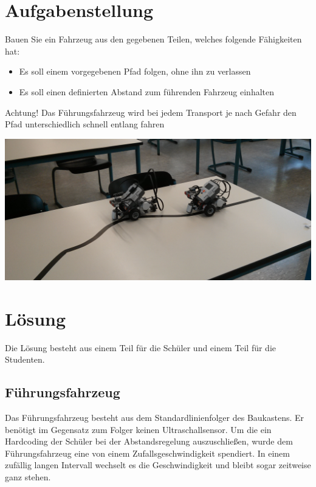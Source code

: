   \section{Aufgabenstellung}
    Bauen Sie ein Fahrzeug aus den gegebenen Teilen, welches folgende Fähigkeiten hat:

    \begin{itemize}
      \item Es soll einem vorgegebenen Pfad folgen, ohne ihn zu verlassen
      \item Es soll einen definierten Abstand zum führenden Fahrzeug einhalten
    \end{itemize}

    Achtung! Das Führungsfahrzeug wird bei jedem Transport je nach Gefahr den Pfad unterschiedlich schnell entlang fahren

    \begin{capfigure}[Strecke]
      \includegraphics[width=\textwidth]{images/fotokonvoi}
    \end{capfigure}
    
  \section{Lösung}
    Die Lösung besteht aus einem Teil für die Schüler und einem Teil für die Studenten.
    
    \subsection{Führungsfahrzeug}
      Das Führungsfahrzeug besteht aus dem Standardlinienfolger des Baukastens. Er benötigt im Gegensatz zum Folger keinen Ultraschallsensor. Um die ein Hardcoding der Schüler bei der Abstandsregelung auszuschließen, wurde dem Führungsfahrzeug eine von einem Zufallsgeschwindigkeit spendiert. In einem zufällig langen Intervall wechselt es die Geschwindigkeit und bleibt sogar zeitweise ganz stehen. 
      
